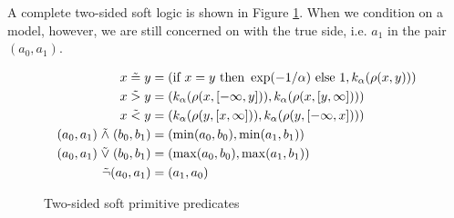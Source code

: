 A complete two-sided soft logic is shown in Figure \ref{softw}.
When we condition on a model, however,  we are still concerned on with the true side, i.e. $a_1$ in the pair $(a_0, a_1)$.




\begin{figure}
\begin{align*}
x \mathrel{\tilde{=}} y &= (\text{if } x = y  \text{ then } \exp(-1/\alpha) \text{ else } 1, k_\alpha(\rho(x, y)))\\
x \mathrel{\tilde{>}} y &= (k_\alpha(\rho(x, [-\infty, y])), k_\alpha(\rho(x, [y, \infty])))\\
x \mathrel{\tilde{<}} y &= (k_\alpha(\rho(y, [x, \infty])), k_\alpha(\rho(y, [-\infty, x])))\\
(a_0, a_1) \mathrel{\tilde{\land}} (b_0, b_1) &= (\min(a_0, b_0), \min(a_1, b_1))\\
(a_0, a_1) \mathrel{\tilde{\lor}} (b_0, b_1) &= (\max(a_0, b_0), \max(a_1, b_1))\\
\tilde{\neg}(a_0, a_1) &= (a_1, a_0)
\end{align*}
\caption{Two-sided soft primitive predicates}
\label{softw}
\end{figure}

